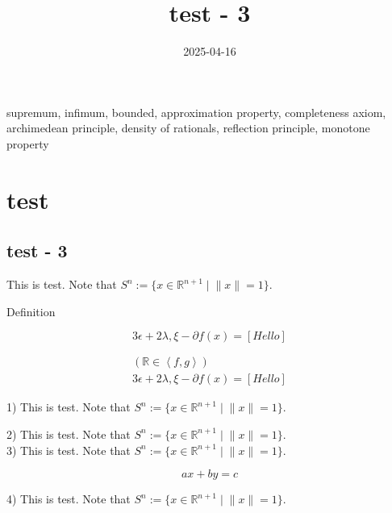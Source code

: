 \documentclass[11pt,reqno]{amsart}
\theoremstyle{definition}
\theoremstyle{remark}
\numberwithin{equation}{section}
\newcommand{\ep}{\epsilon}
\newcommand{\lx}{{\lambda, \xi}}
\newcommand{\pa}{\partial}
\renewcommand{\(}{\left(}
\renewcommand{\)}{\right)}
\newcommand{\R}{\mathbb{R}}
\newcommand{\inner}[2]{\left< #1, #2 \right>}
\newcommand{\test}[1]{\left[ #1 \right]}
\newcommand{\midbar}{ \; \big| \; }
\newenvironment{text-box}{}{}
\newcommand{\tags}[1]{#1}
\newcommand{\subheading}[1]{#1}
\begin{document}
\title[]
{test - 3}

\date{2025-04-16}

\maketitle

\tags{
    supremum, infimum, bounded, approximation property, 
    completeness axiom, archimedean principle, density of rationals, 
    reflection principle, monotone property
}

\section{test}

\subsection{test - 3}

This is test. Note that $S^n := \{ x \in \R^{n+1} \midbar \| x \| = 1 \}$.

\subheading{Definition}

\begin{equation}
    3 \epsilon + 2 \lx - \pa f(x) = \test{Hello}
\end{equation}

\begin{align}
    \( \R \in \inner{f}{g} \) \\
    3 \ep + 2 \lx - \pa f(x) = \test{Hello}
\end{align}

\begin{text-box}
    1) This is test. Note that $S^n := \{ x \in \R^{n+1} \midbar \| x \| = 1 \}$.

    2) This is test. Note that $S^n := \{ x \in \R^{n+1} \midbar \| x \| = 1 \}$. \\
    3) This is test. Note that $S^n := \{ x \in \R^{n+1} \midbar \| x \| = 1 \}$.

    \begin{equation}
        ax + by = c
    \end{equation}
    
    4) This is test. Note that $S^n := \{ x \in \R^{n+1} \midbar \| x \| = 1 \}$.
\end{text-box}
\end{document}
